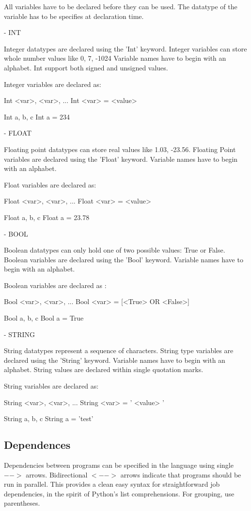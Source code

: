 \begin{enumerate}
All variables have to be declared before they can be used. The datatype of the variable has to be specifies at declaration time.


- INT

Integer datatypes are declared using the 'Int' keyword. Integer variables can store whole number values like 0, 7, -1024
Variable names have to begin with an alphabet. Int support both signed and unsigned values.

Integer variables are declared as:

Int <var>, <var>, ...
Int <var> = <value>

Int a, b, c
Int a = 234


- FLOAT

Floating point datatypes can store real values like 1.03, -23.56. Floating Point variables are declared using the 'Float' keyword. Variable names have to begin with an alphabet.

Float variables are declared as:

Float <var>, <var>, ...
Float <var> = <value>

Float a, b, c
Float a = 23.78


- BOOL

Boolean datatypes can only hold one of two possible values: True or False. Boolean variables are declared using the 'Bool' keyword. Variable names have to begin with an alphabet.

Boolean variables are declared as :

Bool <var>, <var>, ...
Bool <var> = [<True> OR <False>]

Bool a, b, c
Bool a = True



- STRING

String datatypes represent a sequence of characters. String type variables are declared using the 'String' keyword. Variable names have to begin with an alphabet. String values are declared within single quotation marks.

String variables are declared as:

String <var>, <var>, ...
String <var> = ' <value> '

String a, b, c
String a = 'test'


\subsection{Dependences}
Dependencies between programs can be specified in the language using single $-->$ arrows. Bidirectional $<-->$ arrows indicate that programs should be run in parallel. This provides a clean easy syntax for straightforward job dependencies, in the spirit of Python's list comprehensions. For grouping, use parentheses.


\end{enumerate}
